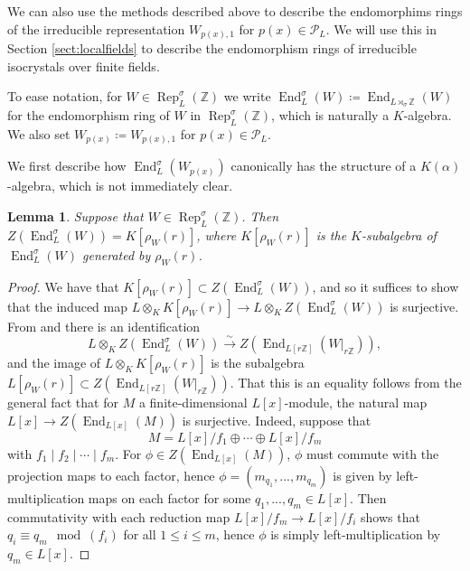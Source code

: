 \documentclass[10pt, reqno, hidelinks]{amsart}
\DeclareMathOperator{\Rep}{Rep}
\DeclareMathOperator{\End}{End}
\newcommand{\bZ}{{\mathbb Z}}
\newcommand{\sP}{{\mathcal P}}
\numberwithin{thm}{subsection}
\newtheorem{lemma}[thm]{Lemma}
\theoremstyle{definition}
\begin{document}
We can also use the methods described above to describe the endomorphims rings of the irreducible representation $W_{p(x), 1}$ for $p(x) \in \sP_L$. We will use this in Section \ref{sect:localfields} to describe the endomorphism rings of irreducible isocrystals over finite fields.

To ease notation, for $W \in \Rep_L^{\sigma}(\bZ)$ we write $\End_{L}^{\sigma}(W) \coloneqq \End_{L \rtimes_{\sigma} \bZ}(W)$ for the endomorphism ring of $W$ in $\Rep_L^{\sigma}(\bZ)$, which is naturally a $K$-algebra. We also set $W_{p(x)} \coloneqq W_{p(x), 1}$ for $p(x) \in \sP_L$.

We first describe how $\End_{L}^{\sigma}(W_{p(x)})$ canonically has the structure of a $K(\alpha)$-algebra, which is not immediately clear.

\begin{lemma}\label{lem:generalcentre}
	Suppose that $W \in \Rep_L^{\sigma}(\bZ)$. Then $Z(\End_L^{\sigma}(W)) = K[\rho_W(r)]$, where $K[\rho_W(r)]$ is the $K$-subalgebra of $\End_L^{\sigma}(W)$ generated by $\rho_W(r)$.
\end{lemma}

\begin{proof}
	We have that $K[\rho_W(r)] \subset Z(\End_L^{\sigma}(W))$, and so it suffices to show that the induced map $L \otimes_K K[\rho_W(r)] \rightarrow L \otimes_K Z(\End_L^{\sigma}(W))$ is surjective. From \cite[Thm.\ A]{TAYSchur} and \cite[Prop. IV.2.3]{milneCFT} there is an identification
	\begin{equation}\label{eqn:basechangeiso}
	L \otimes_K Z(\End_L^{\sigma}(W)) \xrightarrow{\sim} Z(\End_{L[r\bZ]}(W|_{r \bZ})),
	\end{equation}
	and the image of $L \otimes_K K[\rho_W(r)]$ is the subalgebra $L[\rho_W(r)] \subset Z(\End_{L[r\bZ]}(W|_{r \bZ}))$. That this is an equality follows from the general fact that for $M$ a finite-dimensional $L[x]$-module, the natural map $L[x] \rightarrow Z(\End_{L[x]}(M))$ is surjective. Indeed, suppose that
	\[
	M = L[x] / f_1 \oplus \cdots \oplus L[x] / f_m
	\]
	with $f_1 \mid f_2 \mid \cdots \mid f_m$. For $\phi \in Z(\End_{L[x]}(M))$, $\phi$ must commute with the projection maps to each factor, hence $\phi = (m_{q_1}, ... ,m_{q_m})$ is given by left-multiplication maps on each factor for some $q_1, ... ,q_m \in L[x]$. Then commutativity with each reduction map $L[x]/f_m \rightarrow L[x] / f_i$ shows that $q_i \equiv q_m \mod (f_i)$ for all $1 \leq i \leq m$, hence $\phi$ is simply left-multiplication by $q_m \in L[x]$.
\end{proof}
\end{document}
